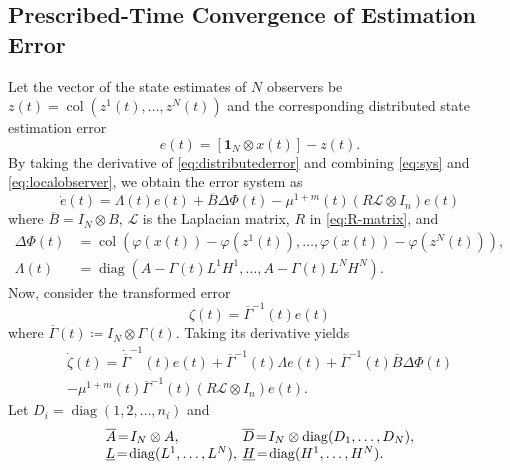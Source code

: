 \documentclass[journal]{IEEEtran}
\newcommand{\diag}{\operatorname{diag}}	%
\newcommand{\col}{\operatorname{col}}
\begin{document}
\subsection{Prescribed-Time Convergence of Estimation Error}
Let the vector of the state estimates of $N$ observers be
$
z(t) = \col(z^{1}(t),\ldots,z^N(t))
$
and the corresponding distributed state estimation error
\begin{equation}\label{eq:distributederror}
 e (t)= [\mathbf{1}_N \otimes x(t)] -z(t). 
\end{equation}
By taking the derivative of \eqref{eq:distributederror} and combining \eqref{eq:sys} and \eqref{eq:localobserver}, we obtain the error system as
\begin{equation}\label{eq:errorthm}
    \dot e(t) = \Lambda(t) e(t) + \overline B \Delta \Phi(t) - \mu^{1+m}(t) (R\mathcal{L}\otimes I_n) e(t)
\end{equation}
where $\overline B  = I_N \otimes B$, $\mathcal L$ is the Laplacian matrix, $R$ in \eqref{eq:R-matrix}, and
\begin{align*}
    \Delta \Phi(t) \!&=\col\!\left(\varphi(x(t))- \varphi(z^1(t)),\ldots,\varphi(x(t))- \varphi(z^N(t))\right), \\
    \Lambda(t) &= \diag(A-\Gamma(t) L^1H^1,\ldots,A-\Gamma(t) L^NH^N).
\end{align*}
Now, consider the transformed error
\begin{equation}\label{eq:distributederrortransformation}
    \zeta(t) = \overline{\Gamma}^{-1}(t) e(t)
\end{equation}
where $\overline{\Gamma}(t) \coloneqq I_N \otimes \Gamma(t)$. 
Taking its derivative yields
\begin{multline*}
        \dot \zeta(t) = \dot {\overline \Gamma}^{-1}(t)e(t) + {\overline \Gamma^{-1}(t) }\Lambda e(t) +{ \overline\Gamma^{-1}(t) \overline B} \Delta \Phi(t) \\
        -\mu^{1+m}(t) { \overline \Gamma^{-1}}(t)(R\mathcal{L}\otimes I_n)e(t).
\end{multline*}
Let $D_i = \diag(1,2,\ldots,n_i)$ and
\begin{equation}\label{eq:matrices-ol-ul}
    \arraycolsep=2pt\begin{array}{ll}
    \overline A \!=\! I_N \otimes A, &
    \overline D \!=\! I_N \otimes \diag(D_1,\ldots,D_N), \\
    \underline L \!=\! \diag(L^{1},\ldots,L^{N}), &
    \underline H \!=\! \diag(H^{1},\ldots,H^{N}).
    \end{array}
\end{equation}
\end{document}
